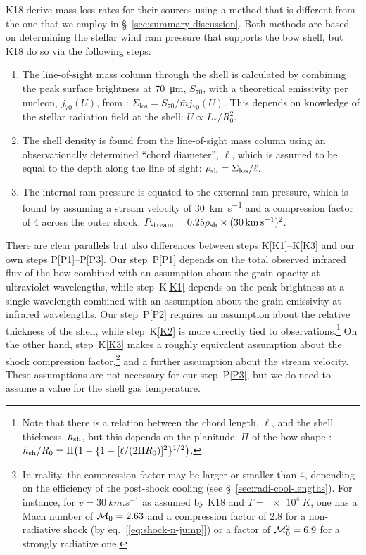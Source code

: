 \newcommand\LOS{\ensuremath{_{\text{los}}}}
K18 derive mass loss rates for their sources using a method that is
different from the one that we employ in
\S~\ref{sec:summary-discussion}.  Both methods are based on
determining the stellar wind ram pressure that supports the bow shell,
but K18 do so via the following steps:
\begin{enumerate}[K1.]
\item \label{K1} The line-of-sight mass column through the shell is
  calculated by combining the peak surface brightness at \SI{70}{\um},
  \(S_{70}\), with a theoretical emissivity per nucleon,
  \(j_{70}(U)\), from \citet{Draine:2007a}:
  \(\Sigma\LOS = S_{70} / \bar{m} j_{70}(U)\).  This depends on
  knowledge of the stellar radiation field at the shell:
  \(U \propto L_* / R_0^2\).
\item \label{K2} The shell density is found from the line-of-sight
  mass column using an observationally determined ``chord diameter'',
  \(\ell\), which is assumed to be equal to the depth along the line
  of sight: \(\rho\shell = \Sigma\LOS / \ell\).
\item \label{K3} The internal ram pressure is equated to the external
  ram pressure, which is found by assuming a stream velocity of
  \SI{30}{km.s^{-1}} and a compression factor of 4 across the outer
  shock:
  \(P_{\text{stream}} = 0.25 \rho_{\text{sh}} \times
  (\SI{30}{km.s^{-1}})^2\).
\end{enumerate}
There are clear parallels but also differences between steps
K\ref{K1}--K\ref{K3} and our own steps P\ref{P1}--P\ref{P3}.  Our
step~P\ref{P1} depends on the total observed infrared flux of the bow
combined with an assumption about the grain opacity at ultraviolet
wavelengths, while step~K\ref{K1} depends on the peak brightness at a
single wavelength combined with an assumption about the grain
emissivity at infrared wavelengths.  Our step~P\ref{P2} requires an
assumption about the relative thickness of the shell, while
step~K\ref{K2} is more directly tied to observations.\footnote{%
  Note that there is a relation between the chord length, \(\ell\),
  and the shell thickness, \(h_{\text{sh}}\), but this depends on the
  planitude, \(\Pi\) of the bow shape \citep{Tarango-Yong:2018a}:
  \( h_{\text{sh}}/R_0 = \Pi \bigl(1 - \{1 - [\ell/(2 \Pi R_0)]^2\}^{1/2}\bigr)\).  } %
On the other hand, step~K\ref{K3} makes a roughly equivalent
assumption about the shock compression factor,\footnote{%
  In reality, the compression factor may be larger or smaller than 4,
  depending on the efficiency of the post-shock cooling (see
  \S~\ref{sec:radi-cool-lengths}).  For instance, for
  \(v = \SI{30}{km.s^{-1}}\) as assumed by K18 and \(T = \SI{e4}{K}\),
  one has a Mach number of \(\mathcal{M}_0 = 2.63\) and a compression factor of
  2.8 for a non-radiative shock (by eq.~[\ref{eq:shock-n-jump}]) or a
  factor of \(\mathcal{M}_0^2 =6.9\) for a strongly radiative one.  } %
and a further assumption about the stream velocity. These assumptions
are not necessary for our step~P\ref{P3}, but we do need to assume a
value for the shell gas temperature.

